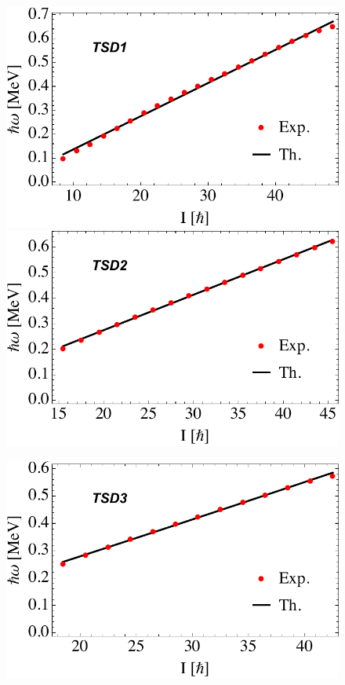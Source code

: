 \documentclass[myclassdoc,debug]{rjparticle}
\begin{document}
\begin{figure}
\centering
\begin{minipage}{.5\textwidth}
  \centering
  \includegraphics[scale=0.44]{figs/hrot_tsd1.pdf}
  \includegraphics[scale=0.44]{figs/hrot_tsd2.pdf}
\end{minipage}%
\begin{minipage}{.5\textwidth}
  \centering
 \includegraphics[scale=0.44]{figs/hrot_tsd3.pdf}

\end{minipage}
\end{figure}
\end{document}
